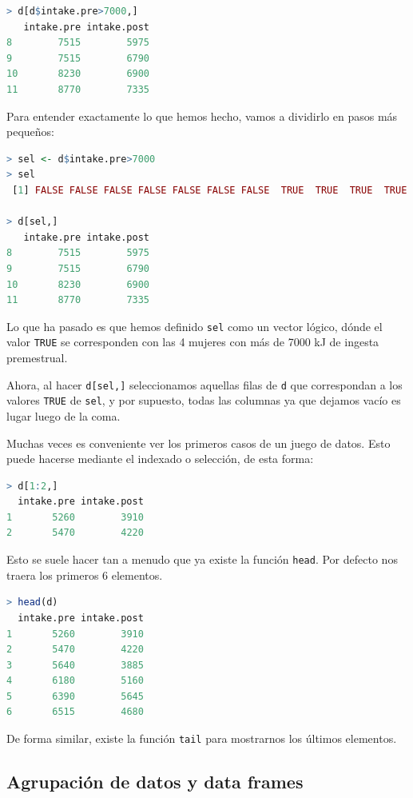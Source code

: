 \begin{lstlisting}[language=R]
> d[d$intake.pre>7000,]
   intake.pre intake.post
8        7515        5975
9        7515        6790
10       8230        6900
11       8770        7335
\end{lstlisting}

Para entender exactamente lo que hemos hecho, vamos a dividirlo en pasos más
pequeños:

\begin{lstlisting}[language=R]
> sel <- d$intake.pre>7000
> sel
 [1] FALSE FALSE FALSE FALSE FALSE FALSE FALSE  TRUE  TRUE  TRUE  TRUE

> d[sel,]
   intake.pre intake.post
8        7515        5975
9        7515        6790
10       8230        6900
11       8770        7335
\end{lstlisting}

Lo que ha pasado es que hemos definido \texttt{sel} como un vector lógico,
dónde el valor \texttt{TRUE} se corresponden con las 4 mujeres con más de 7000
kJ de ingesta premestrual.

Ahora, al hacer \texttt{d[sel,]} seleccionamos aquellas filas de \texttt{d} que
correspondan a los valores \texttt{TRUE} de \texttt{sel}, y por supuesto, todas
las columnas ya que dejamos vacío es lugar luego de la coma.

Muchas veces es conveniente ver los primeros casos de un juego de datos. Esto
puede hacerse mediante el indexado o selección, de esta forma:

\begin{lstlisting}[language=R]
> d[1:2,]
  intake.pre intake.post
1       5260        3910
2       5470        4220
\end{lstlisting}

Esto se suele hacer tan a menudo que ya existe la función \texttt{head}. Por
defecto nos traera los primeros 6 elementos.

\begin{lstlisting}[language=R]
> head(d)
  intake.pre intake.post
1       5260        3910
2       5470        4220
3       5640        3885
4       6180        5160
5       6390        5645
6       6515        4680
\end{lstlisting}

De forma similar, existe la función \texttt{tail} para mostrarnos los últimos
elementos.

\subsection{Agrupación de datos y data frames}

